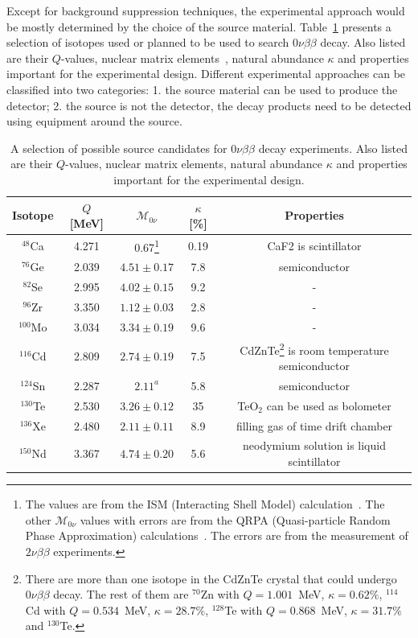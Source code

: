 Except for background suppression techniques, the experimental approach would be mostly determined by the choice of the source material. Table~\ref{tab:gerda:iso} presents a selection of isotopes used or planned to be used to search $0\nu\beta\beta$ decay. Also listed are their $Q$-values, nuclear matrix elements~\cite{Mut90, Rod07, Sim08, Cau08}, natural abundance $\kappa$ and properties important for the experimental design. Different experimental approaches can be classified into two categories: 1. the source material can be used to produce the detector; 2. the source is not the detector, the decay products need to be detected using equipment around the source.
\begin{table}[htbp]
  \centering
  \caption{A selection of possible source candidates for         $0\nu\beta\beta$ decay experiments. Also listed are their $Q$-values,     nuclear matrix elements, natural abundance $\kappa$ and properties     important for the experimental design.}
  \label{tab:gerda:iso}
  \begin{minipage}{\linewidth}
    \begin{tabular}{ccccc} \hline Isotope & $Q$ [MeV] &       $\mathcal{M}_{0\nu}$ & $\kappa$ [\%] & Properties \\\hline       $^{48}$Ca & 4.271 & 0.67\footnote{The values are from the ISM         (Interacting Shell Model) calculation~\cite{Cau08}.  The other         $\mathcal{M}_{0\nu}$ values with errors are from the QRPA         (Quasi-particle Random Phase Approximation)         calculations~\cite{Rod07}. The errors are from the measurement         of $2\nu\beta\beta$ experiments.} & 0.19 & CaF2 is       scintillator \\
      $^{76}$Ge & 2.039 & $4.51 \pm 0.17$ & 7.8 & semiconductor \\
      $^{82}$Se & 2.995 & $4.02 \pm 0.15$ & 9.2 & - \\
      $^{96}$Zr & 3.350 & $1.12 \pm 0.03$ & 2.8 & - \\
      $^{100}$Mo & 3.034 & $3.34 \pm 0.19$ & 9.6 & - \\
      $^{116}$Cd & 2.809 & $2.74 \pm 0.19$ & 7.5 &       CdZnTe\footnote{There are more than one isotope in the CdZnTe         crystal that could undergo $0\nu\beta\beta$ decay. The rest of         them are $^{70}$Zn with $Q = 1.001$~MeV, $\kappa = 0.62\%$,         $^{114}$Cd with $Q = 0.534$~MeV, $\kappa = 28.7\%$, $^{128}$Te         with $Q = 0.868$~MeV, $\kappa = 31.7\%$ and $^{130}$Te.} is       room temperature semiconductor\\
      $^{124}$Sn & 2.287 & $2.11^{a}$ & 5.8 & semiconductor \\
      $^{130}$Te & 2.530 & $3.26 \pm 0.12$ & 35 & TeO$_{2}$ can be       used as bolometer\\
      $^{136}$Xe & 2.480 & $2.11 \pm 0.11$ & 8.9 & filling gas of       time drift       chamber\\
      $^{150}$Nd & 3.367 & $4.74 \pm 0.20$ & 5.6 & neodymium solution       is liquid       scintillator\\
    \end{tabular}
  \end{minipage}
\end{table}

